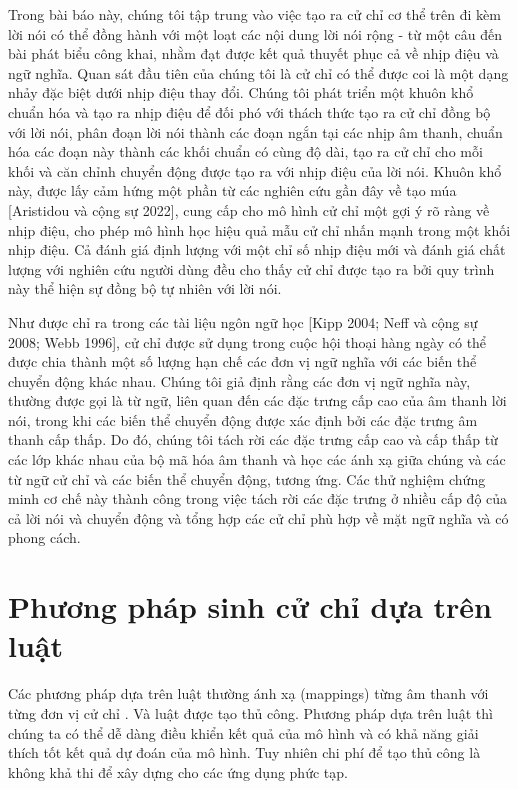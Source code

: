 Trong bài báo này, chúng tôi tập trung vào việc tạo ra cử chỉ cơ thể trên đi kèm lời nói có thể đồng hành với một loạt các nội dung lời nói rộng - từ một câu đến bài phát biểu công khai, nhằm đạt được kết quả thuyết phục cả về nhịp điệu và ngữ nghĩa. Quan sát đầu tiên của chúng tôi là cử chỉ có thể được coi là một dạng nhảy đặc biệt dưới nhịp điệu thay đổi. Chúng tôi phát triển một khuôn khổ chuẩn hóa và tạo ra nhịp điệu để đối phó với thách thức tạo ra cử chỉ đồng bộ với lời nói, phân đoạn lời nói thành các đoạn ngắn tại các nhịp âm thanh, chuẩn hóa các đoạn này thành các khối chuẩn có cùng độ dài, tạo ra cử chỉ cho mỗi khối và căn chỉnh chuyển động được tạo ra với nhịp điệu của lời nói. Khuôn khổ này, được lấy cảm hứng một phần từ các nghiên cứu gần đây về tạo múa [Aristidou và cộng sự 2022], cung cấp cho mô hình cử chỉ một gợi ý rõ ràng về nhịp điệu, cho phép mô hình học hiệu quả mẫu cử chỉ nhấn mạnh trong một khối nhịp điệu. Cả đánh giá định lượng với một chỉ số nhịp điệu mới và đánh giá chất lượng với nghiên cứu người dùng đều cho thấy cử chỉ được tạo ra bởi quy trình này thể hiện sự đồng bộ tự nhiên với lời nói.

Như được chỉ ra trong các tài liệu ngôn ngữ học [Kipp 2004; Neff và cộng sự 2008; Webb 1996], cử chỉ được sử dụng trong cuộc hội thoại hàng ngày có thể được chia thành một số lượng hạn chế các đơn vị ngữ nghĩa với các biến thể chuyển động khác nhau. Chúng tôi giả định rằng các đơn vị ngữ nghĩa này, thường được gọi là từ ngữ, liên quan đến các đặc trưng cấp cao của âm thanh lời nói, trong khi các biến thể chuyển động được xác định bởi các đặc trưng âm thanh cấp thấp. Do đó, chúng tôi tách rời các đặc trưng cấp cao và cấp thấp từ các lớp khác nhau của bộ mã hóa âm thanh và học các ánh xạ giữa chúng và các từ ngữ cử chỉ và các biến thể chuyển động, tương ứng. Các thử nghiệm chứng minh cơ chế này thành công trong việc tách rời các đặc trưng ở nhiều cấp độ của cả lời nói và chuyển động và tổng hợp các cử chỉ phù hợp về mặt ngữ nghĩa và có phong cách.

\section{Phương pháp sinh cử chỉ dựa trên luật}

Các phương pháp dựa trên luật thường ánh xạ (mappings) từng âm thanh với từng đơn vị cử chỉ \cite{huang2012robot}. Và luật được tạo thủ công. Phương pháp dựa trên luật thì chúng ta có thể dễ dàng điều khiển kết quả của mô hình và có khả năng giải thích tốt kết quả dự đoán của mô hình.
Tuy nhiên chi phí để tạo thủ công là không khả thi để xây dựng cho các ứng dụng phức tạp.

